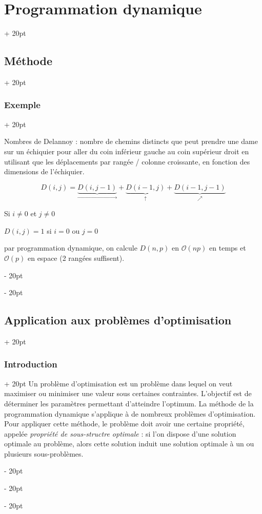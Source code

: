 \documentclass[a4paper, 12pt, twoside]{article}
\newcommand{\ind}[1][20pt]{\advance\leftskip + #1}
\newcommand{\deind}[1][20pt]{\advance\leftskip - #1}
\newenvironment{indt}[2][20pt]{#2 \par \ind[#1]}{\par \deind} %
\begin{document}
\begin{indt}{\section{Programmation dynamique}}
\begin{indt}{\subsection{Méthode}}
            \begin{indt}{\subsubsection{Exemple}}
                \label{3.1.4}
                
                Nombres de Delannoy : nombre de chemins distincts que peut prendre une dame sur un échiquier pour aller du coin inférieur gauche au coin supérieur droit en utilisant que les déplacements par rangée / colonne croissante, en fonction des dimensions de l'échiquier.
                
                \begin{center}
                \end{center}
                
                \[ D(i, j) = \underbrace{D(i, j - 1)}_{\rightarrow} + \underbrace{D(i - 1, j)}_{\uparrow} + \underbrace{D(i - 1, j - 1)}_{\nearrow} \]
                
                Si $i \neq 0$ et $j \neq 0$
                
                $D(i, j) = 1$ si $i = 0$ ou $j = 0$
                
                par programmation dynamique, on calcule $D(n, p)$ en $\mathcal O(np)$ en temps et $\mathcal O(p)$ en espace (2 rangées suffisent).
            \end{indt}
        \end{indt}
        
        \vspace{12pt}
        
        \begin{indt}{\subsection{Application aux problèmes d'optimisation}}
            \begin{indt}{\subsubsection{Introduction}}
                Un problème d'optimisation est un problème dans lequel on veut maximiser ou minimiser une valeur sous certaines contraintes.
                L'objectif est de déterminer les paramètres permettant d'atteindre l'optimum. La méthode de la programmation dynamique s'applique à de nombreux problèmes d'optimisation.
                Pour appliquer cette méthode, le problème doit avoir une certaine propriété, appelée \textit{propriété de sous-structre optimale} : si l'on dispose d'une solution optimale au problème, alors cette solution induit une solution optimale à un ou plusieurs sous-problèmes.
                

\end{indt}
\end{indt}
\end{indt}
\end{document}
